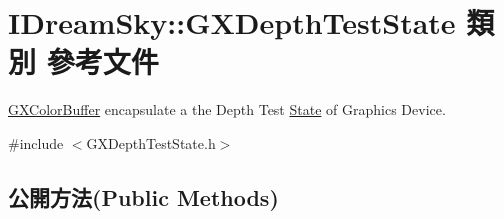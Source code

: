\hypertarget{class_i_dream_sky_1_1_g_x_depth_test_state}{}\section{I\+Dream\+Sky\+:\+:G\+X\+Depth\+Test\+State 類別 參考文件}
\label{class_i_dream_sky_1_1_g_x_depth_test_state}


\hyperlink{class_i_dream_sky_1_1_g_x_color_buffer}{G\+X\+Color\+Buffer} encapsulate a the Depth Test \hyperlink{class_i_dream_sky_1_1_state}{State} of Graphics Device.  




{\ttfamily \#include $<$G\+X\+Depth\+Test\+State.\+h$>$}

\subsection*{公開方法(Public Methods)}

